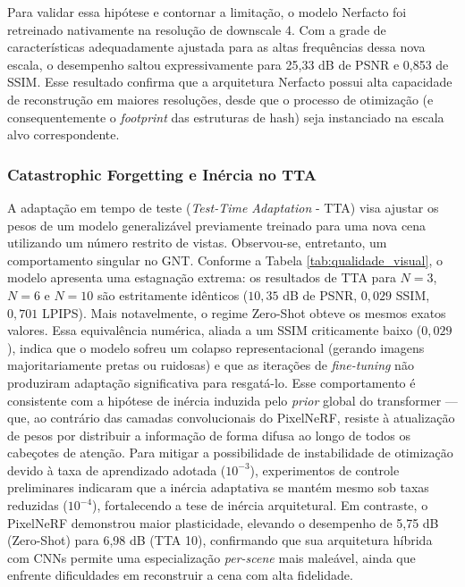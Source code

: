 \documentclass[12pt]{article}
\begin{document}
Para validar essa hipótese e contornar a limitação, o modelo Nerfacto foi retreinado nativamente na resolução de downscale 4. Com a grade de características adequadamente ajustada para as altas frequências dessa nova escala, o desempenho saltou expressivamente para 25,33 dB de PSNR e 0,853 de SSIM. Esse resultado confirma que a arquitetura Nerfacto possui alta capacidade de reconstrução em maiores resoluções, desde que o processo de otimização (e consequentemente o \textit{footprint} das estruturas de hash) seja instanciado na escala alvo correspondente.

\subsubsection{Catastrophic Forgetting e Inércia no TTA}

A adaptação em tempo de teste (\textit{Test-Time Adaptation} - TTA) visa ajustar os pesos de um modelo generalizável previamente treinado para uma nova cena utilizando um número restrito de vistas. Observou-se, entretanto, um comportamento singular no GNT. Conforme a Tabela \ref{tab:qualidade_visual}, o modelo apresenta uma estagnação extrema: os resultados de TTA para $N=3$, $N=6$ e $N=10$ são estritamente idênticos ($10{,}35$ dB de PSNR, $0{,}029$ SSIM, $0{,}701$ LPIPS). Mais notavelmente, o regime Zero-Shot obteve os mesmos exatos valores. Essa equivalência numérica, aliada a um SSIM criticamente baixo ($0{,}029$), indica que o modelo sofreu um colapso representacional (gerando imagens majoritariamente pretas ou ruidosas) e que as iterações de \textit{fine-tuning} não produziram adaptação significativa para resgatá-lo. Esse comportamento é consistente com a hipótese de inércia induzida pelo \textit{prior} global do transformer — que, ao contrário das camadas convolucionais do PixelNeRF, resiste à atualização de pesos por distribuir a informação de forma difusa ao longo de todos os cabeçotes de atenção. Para mitigar a possibilidade de instabilidade de otimização devido à taxa de aprendizado adotada ($10^{-3}$), experimentos de controle preliminares indicaram que a inércia adaptativa se mantém mesmo sob taxas reduzidas ($10^{-4}$), fortalecendo a tese de inércia arquitetural. Em contraste, o PixelNeRF demonstrou maior plasticidade, elevando o desempenho de 5,75 dB (Zero-Shot) para 6,98 dB (TTA 10), confirmando que sua arquitetura híbrida com CNNs permite uma especialização \textit{per-scene} mais maleável, ainda que enfrente dificuldades em reconstruir a cena com alta fidelidade.
\end{document}
